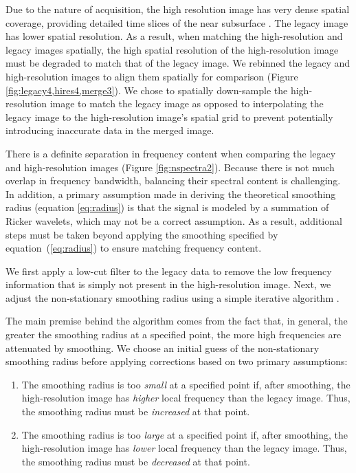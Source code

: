 Due to the nature of acquisition, the high resolution image has very dense spatial coverage, providing detailed time slices of the near subsurface \cite[]{tip}.
The legacy image has lower spatial resolution.
As a result, when matching the high-resolution and legacy images spatially, the high spatial resolution of the high-resolution image must be degraded to match that of the legacy image.
We rebinned the legacy and high-resolution images to align them spatially for comparison (Figure \ref{fig:legacy4,hires4,merge3}).
We chose to spatially down-sample the high-resolution image to match the legacy image as opposed to interpolating the legacy image to the high-resolution image's spatial grid to prevent potentially introducing inaccurate data in the merged image.

There is a definite separation in frequency content when comparing the legacy and high-resolution images (Figure \ref{fig:nspectra2}).
Because there is not much overlap in frequency bandwidth, balancing their spectral content is challenging.
In addition, a primary assumption made in deriving the theoretical smoothing radius (equation \ref{eq:radius}) is that the signal is modeled by a summation of Ricker wavelets, which may not be a correct assumption.
As a result, additional steps must be taken beyond applying the smoothing specified by equation~(\ref{eq:radius}) to ensure matching frequency content.

We first apply a low-cut filter to the legacy data to remove the low frequency information that is simply not present in the high-resolution image.
Next, we adjust the non-stationary smoothing radius using a simple iterative algorithm \cite[]{locfreq}.

The main premise behind the algorithm comes from the fact that, in general, the greater the smoothing radius at a specified point, the more high frequencies are attenuated by smoothing.
We choose an initial guess of the non-stationary smoothing radius before applying corrections based on two primary assumptions:
\begin{enumerate}
\item The smoothing radius is too \emph{small} at a specified point if, after smoothing, the high-resolution image has \emph{higher} local frequency than the legacy image.
        Thus, the smoothing radius must be \emph{increased} at that point.
\item The smoothing radius is too \emph{large} at a specified point if, after smoothing, the high-resolution image has \emph{lower} local frequency than the legacy image.
        Thus, the smoothing radius must be \emph{decreased} at that point.
\end{enumerate}

